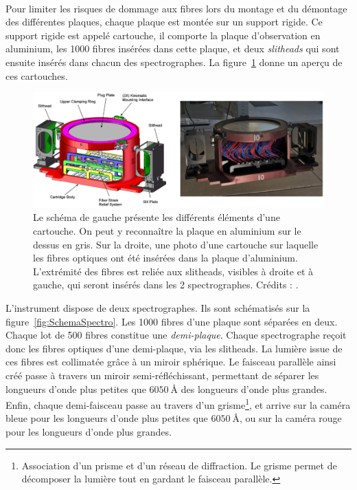 \paragraph{} Pour limiter les risques de dommage aux fibres lors du montage et du démontage des différentes plaques, chaque plaque est montée sur un support rigide. Ce support rigide est appelé cartouche, il comporte la plaque d'observation en aluminium, les \num{1000} fibres insérées dans cette plaque, et deux \emph{slitheads} qui sont ensuite insérés dans chacun des spectrographes. La figure~\ref{fig:CartoucheImage} donne un aperçu de ces cartouches.\\
\begin{figure}
  \centering
  \includegraphics[scale=0.35]{CartoucheImage}
  \caption{Le schéma de gauche présente les différents éléments d'une cartouche. On peut y reconnaître la plaque en aluminium sur le dessus en gris. Sur la droite, une photo d'une cartouche sur laquelle les fibres optiques ont été insérées dans la plaque d'aluminium. L'extrémité des fibres est reliée aux slitheads, visibles à droite et à gauche, qui seront insérés dans les 2 spectrographes. Crédits : \textcite{Smee2012}.}
  \label{fig:CartoucheImage}
\end{figure}
L'instrument dispose de deux spectrographes. Ils sont schématisés sur la figure~\ref{fig:SchemaSpectro}.
Les \num{1000} fibres d'une plaque sont séparées en deux. Chaque lot de \num{500} fibres constitue une \emph{demi-plaque}. Chaque spectrographe reçoit donc les fibres optiques d'une demi-plaque, via les slitheads.
La lumière issue de ces fibres est collimatée grâce à un miroir sphérique. Le faisceau parallèle ainsi créé passe à travers un miroir semi-réfléchissant, permettant de séparer les longueurs d'onde plus petites que $\SI{6050}{\angstrom}$ des longueurs d'onde plus grandes. Enfin, chaque demi-faisceau passe au travers d'un grisme\footnote{Association d'un prisme et d'un réseau de diffraction. Le grisme permet de décomposer la lumière tout en gardant le faisceau parallèle.}, et arrive sur la caméra bleue pour les longueurs d'onde plus petites que $\SI{6050}{\angstrom}$, ou sur la caméra rouge pour les longueurs d'onde plus grandes. 
